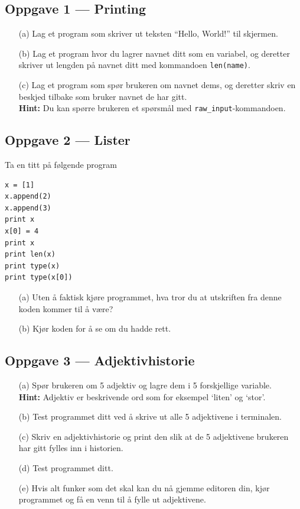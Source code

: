 \documentclass[a4paper, 11pt, notitlepage]{article}
\begin{document}
\subsection*{Oppgave 1 --- Printing}
\begin{itemize}
	\item[(a)] Lag et program som skriver ut teksten ``Hello, World!'' til skjermen.
	\item[(b)] Lag et program hvor du lagrer navnet ditt som en variabel, og deretter skriver ut lengden på navnet ditt med kommandoen \verb+len(name)+.
	\item[(c)] Lag et program som spør brukeren om navnet dems, og deretter skriv en beskjed tilbake som bruker navnet de har gitt. \\
	\textbf{Hint:} Du kan spørre brukeren et spørsmål med \verb+raw_input+-kommandoen. 
\end{itemize}

\subsection*{Oppgave 2 --- Lister}
Ta en titt på følgende program
\begin{lstlisting}
x = [1]
x.append(2)
x.append(3)
print x 
x[0] = 4
print x
print len(x)
print type(x)
print type(x[0])
\end{lstlisting}
\begin{itemize}
	\item[(a)] Uten å faktisk kjøre programmet, hva tror du at utskriften fra denne koden kommer til å være?
	\item[(b)] Kjør koden for å se om du hadde rett.
\end{itemize}



\subsection*{Oppgave 3 --- Adjektivhistorie}
\begin{itemize}
\item[(a)] Spør brukeren om 5 adjektiv og lagre dem i 5 forskjellige variable. \\
	\textbf{Hint:} Adjektiv er beskrivende ord som for eksempel `liten' og `stor'.
\item[(b)] Test programmet ditt ved å skrive ut alle 5 adjektivene i terminalen.
\item[(c)] Skriv en adjektivhistorie og print den slik at de 5 adjektivene brukeren har gitt fylles inn i historien.
\item[(d)] Test programmet ditt.
\item[(e)] Hvis alt funker som det skal kan du nå gjemme editoren din, kjør programmet og få en venn til å fylle ut adjektivene.
\end{itemize}
\end{document}
